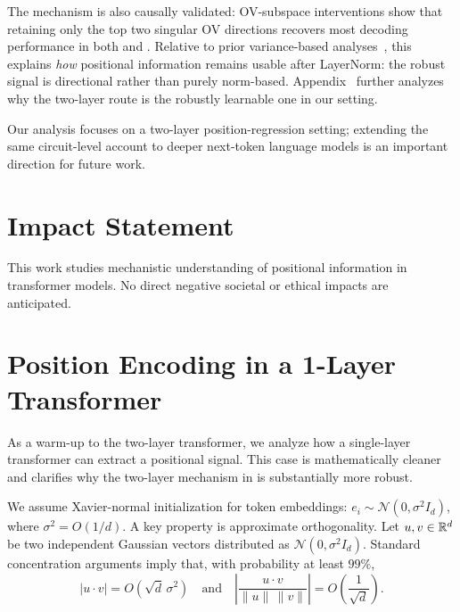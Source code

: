 \documentclass{article}
\theoremstyle{plain}
\theoremstyle{definition}
\theoremstyle{remark}
\begin{document}
The mechanism is also causally validated: OV-subspace interventions show that retaining only the top two singular OV directions recovers most decoding performance in both \modelminimal and \modelfull.
Relative to prior variance-based analyses~\citep{chi-etal-2023-latent}, this explains \emph{how} positional information remains usable after LayerNorm: the robust signal is directional rather than purely norm-based.
Appendix~ further analyzes why the two-layer route is the robustly learnable one in our setting.

Our analysis focuses on a two-layer position-regression setting; extending the same circuit-level account to deeper next-token language models is an important direction for future work.


\section*{Impact Statement}
This work studies mechanistic understanding of positional information in transformer models. No direct negative
societal or ethical impacts are anticipated.





\clearpage

\appendix
{}

\section{Position Encoding in a 1-Layer Transformer}
\label{app:1block_appendix}

As a warm-up to the two-layer transformer, we analyze how a single-layer transformer can extract a positional signal. This case is mathematically cleaner and clarifies why the two-layer mechanism in  is substantially more robust.

We assume Xavier-normal initialization for token embeddings: \(e_i \sim \mathcal{N}(0,\sigma^2 I_d)\), where \(\sigma^2 = O(1/d)\). A key property is approximate orthogonality. Let \(u,v\in \mathbb{R}^d\) be two independent Gaussian vectors distributed as \(\mathcal{N}(0,\sigma^2 I_d)\). Standard concentration arguments imply that, with probability at least \(99\%\),
\[
|u \cdot v| = O(\sqrt{d}\,\sigma^2)
\quad\text{and}\quad
\left|\frac{u \cdot v}{\|u\|\,\|v\|}\right| = O\!\left(\frac{1}{\sqrt{d}}\right).
\]
\end{document}
